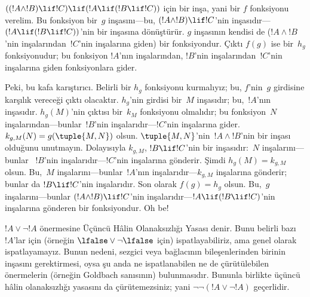 \begin{ex}
$((!A \land !B) \lif !C) \lif (!A \lif (!B \lif !C))$ için bir inşa, yani
bir $f$ fonksiyonu verelim. Bu fonksiyon bir~$g$ inşasını---bu, $(!A \land
!B) \lif !C$'nin inşasıdır---$(!A \lif (!B \lif !C))$'nin bir inşasına
dönüştürür. $g$ inşasının kendisi de ($!A \land !B$'nin inşalarından~$!C$'nin
inşalarına giden) bir fonksiyondur. Çıktı $f(g)$ ise bir~$h_g$ fonksiyonudur;
bu fonksiyon $!A$'nın inşalarından, $!B$'nin inşalarından~$!C$'nin inşalarına
giden fonksiyonlara gider.

Peki, bu kafa karıştırıcı. Belirli bir $h_g$ fonksiyonu kurmalıyız; bu,
$f$'nin~$g$ girdisine karşılık vereceği çıktı olacaktır. $h_g$'nin girdisi
bir~$M$ inşasıdır; bu,~$!A$'nın inşasıdır. $h_g(M)$'nin çıktısı bir~$k_M$
fonksiyonu olmalıdır; bu fonksiyon~$N$ inşalarından---bunlar~$!B$'nin
inşalarıdır---$!C$'nin inşalarına gider. $k_{g,M}(N) = g(\tuple{M, N})$
olsun. $\tuple{M, N}$'nin~$!A \land !B$'nin bir inşası olduğunu unutmayın.
Dolayısıyla $k_{g,M}$, $!B \lif !C$'nin bir inşasıdır:~$N$ inşalarını---bunlar
~$!B$'nin inşalarıdır---$!C$'nin inşalarına gönderir. Şimdi $h_g(M) =
k_{g,M}$ olsun. Bu,~$M$ inşalarını---bunlar~$!A$'nın inşalarıdır---$k_{g,M}$
inşalarına gönderir; bunlar da $!B \lif !C$'nin inşalarıdır. Son olarak
$f(g) = h_g$ olsun. Bu,~$g$ inşalarını---bunlar $(!A \land !B) \lif !C$'nin
inşalarıdır---$!A \lif (!B \lif !C)$'nin inşalarına gönderen bir
fonksiyondur. Oh be!{}
\end{ex}

$!A \lor \lnot !A$ önermesine Üçüncü Hâlin Olanaksızlığı Yasası denir. Bunu
belirli bazı $!A$'lar için (örneğin $\lfalse \lor \lnot \lfalse$ için)
ispatlayabiliriz, ama genel olarak ispatlayamayız. Bunun nedeni, sezgici veya
bağlacının bileşenlerinden birinin inşasını gerektirmesi, oysa şu anda ne
ispatlanabilen ne de çürütülebilen önermelerin (örneğin Goldbach sanısının)
bulunmasıdır. Bununla birlikte üçüncü hâlin olanaksızlığı yasasını da
çürütemezsiniz; yani $\lnot \lnot (!A \lor \lnot !A)$ geçerlidir.

